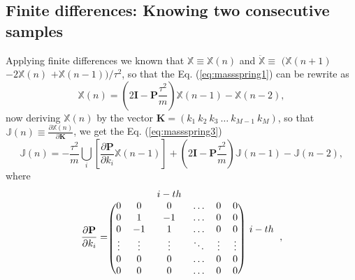 \documentclass[review]{elsarticle}
\begin{document}
\subsection{Finite differences: Knowing two consecutive samples}
\label{subsec:findiff1}
Applying finite differences we known that $\mathbb{X} \equiv \mathbb{X}(n)$ and
$\mathbb{\ddot{X}} \equiv$ $( \mathbb{X}(n+1)$ $-2\mathbb{X}(n)$ $+\mathbb{X}(n-1) ) /{\tau^2}$,
so that the Eq. (\ref{eq:massspring1}) can be rewrite as
\begin{equation}\label{eq:massspring2}
 \mathbb{X}(n) = \left(2 \mathbf{I} -\mathbf{P}\frac{\tau^2}{m}\right) \mathbb{X}(n-1)-\mathbb{X}(n-2),
\end{equation}
now deriving $\mathbb{X}(n)$ by the vector $\mathbf{K}=( k_1~ k_2~ k_3~ \hdots ~ k_{M-1}~ k_M)$,
so that $\mathbb{J}(n) \equiv \frac{\partial \mathbb{X}(n)}{\partial \mathbf{K}}$,
we get the Eq.  (\ref{eq:massspring3})
\begin{equation}\label{eq:massspring3}
 \mathbb{J}(n) = 
 -\frac{\tau^2}{m}\bigcup_{i}{ \left[ \frac{ \partial \mathbf{P} }{\partial k_{i}}  \mathbb{X}(n-1)\right] }
 +\left(2 \mathbf{I} -\mathbf{P}\frac{\tau^2}{m}\right) \mathbb{J}(n-1)
 -\mathbb{J}(n-2),
\end{equation}
where 
\begin{equation}\label{eq:dPdki}
 \frac{ \partial \mathbf{P}}{\partial k_{i}} = 
 \begin{blockarray}{ccccccc}
 ~       & ~       & i-th    & ~       & ~           & ~  & ~\\
 \begin{block}{(cccccc)c}
 0       & 0       & 0       &  \hdots & 0           & 0  & ~\\
 0       & 1       & -1      &  \hdots & 0           & 0  & ~\\
 0       & -1      & 1       &  \hdots & 0           & 0  & i-th\\
 \vdots  & \vdots  & \vdots  &  \ddots & \vdots      & \vdots & ~\\
 0       & 0       & 0       &  \hdots & 0           & 0  & ~\\
 0       & 0       & 0       &  \hdots & 0           & 0  & ~\\
\end{block}
\end{blockarray}
,
\end{equation}


\end{document}
